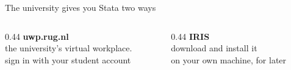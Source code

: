 \documentclass[aspectratio=169,11pt]{beamer}
\begin{document}
\begin{frame}{The university gives you Stata two ways}
  \vspace*{0.9cm}
  \begin{columns}[T]
    \begin{column}{0.44\textwidth}\centering
      {\ttfamily\bfseries\color{SlateTeal}uwp.rug.nl}\\[0.6em]
      {\small the university's virtual workplace.\\ sign in with your student account}
    \end{column}
    \begin{column}{0.44\textwidth}\centering
      {\ttfamily\bfseries\color{SlateTeal}IRIS}\\[0.6em]
      {\small download and install it\\ on your own machine, for later}
    \end{column}
  \end{columns}
\end{frame}
\end{document}

